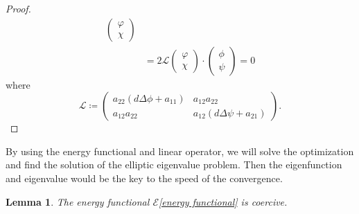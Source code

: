 \documentclass[11pt]{amsart}
\numberwithin{equation}{section}
\theoremstyle{plain}
\newtheorem{lemma}[theorem]{Lemma}
\theoremstyle{definition}
\begin{document}
\begin{proof}
\begin{equation*}
\begin{aligned}
\begin{pmatrix}
\varphi \\ \chi
\end{pmatrix} \\
&= 2 \mathcal{L}
\begin{pmatrix}
\varphi \\ \chi
\end{pmatrix}
\cdot
\begin{pmatrix}
\phi \\ \psi
\end{pmatrix}
= 0
\end{aligned}
\end{equation*}
where
\begin{equation*}
	\mathcal{L} \coloneqq \begin{pmatrix}
	a_{22}(d\Delta \phi +a_{11}) & a_{12}a_{22} \\
		a_{12}a_{22} & a_{12}(d\Delta\psi+ a_{21})
\end{pmatrix}.
\end{equation*}
\end{proof}

By using the energy functional and linear operator, we will solve the optimization and find the solution of the elliptic eigenvalue problem. Then the eigenfunction and eigenvalue would be the key to the speed of the convergence.
\begin{lemma}
	The energy functional $\mathcal{E}$\cref{energy functional} is coercive.
\end{lemma}
\end{document}
